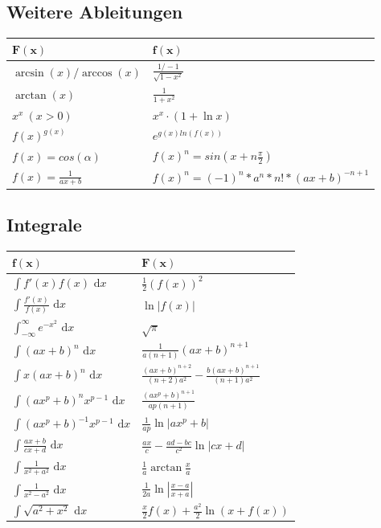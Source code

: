 \documentclass[8pt]{article}
\def\dx{\text{ d}x}
\begin{document}
\begin{multicols*}{3}
\subsection{Weitere Ableitungen}
\begin{center}
  \begin{tabularx}{\linewidth}{>{\centering\arraybackslash}X>{\centering\arraybackslash}X}
  
  $\mathbf{F(x)}$ & $\mathbf{f(x)}$ \\
  \midrule
  $\arcsin(x) / \arccos(x)$ & $\frac{1 / -1}{\sqrt{1 - x^2}}$ \\
  $\arctan(x)$ & $\frac{1}{1 + x^2}$ \\ 
  $x^x \ (x > 0)$ & $x^x \cdot (1 + \ln x)$ \\
$f(x)^{g(x)}$ & $e^{g(x) ln(f(x))}$\\
$f(x) = cos(\alpha)$ & $f(x)^n = sin(x + n\frac{\pi}{2})$\\
$f(x) = \frac{1}{ax + b}$ & $f(x)^n = (-1)^n * a^n * n! * (ax + b)^{-n+1}$\\

  \bottomrule
  \end{tabularx}
\end{center}
\subsection{Integrale}
\begin{center}
 \begin{tabularx}{\linewidth}{>{\centering\arraybackslash}X>{\centering\arraybackslash}X}
  
  $\mathbf{f(x)}$ & $\mathbf{F(x)}$ \\
  \midrule
  $\int f'(x) f(x) \dx$ & $\frac{1}{2}(f(x))^2$ \\
  $\int \frac{f'(x)}{f(x)} \dx$ & $\ln|f(x)|$ \\
  $\int_{-\infty}^\infty e^{-x^2} \dx$ & $\sqrt{\pi}$ \\
  $\int (ax+b)^n \dx$ & $\frac{1}{a(n+1)}(ax+b)^{n+1}$ \\
  $\int x(ax+b)^n \dx$ & $\frac{(ax+b)^{n+2}}{(n+2)a^2} - \frac{b(ax+b)^{n+1}}{(n+1)a^2}$ \\
  $\int (ax^p+b)^n x^{p-1} \dx$ & $\frac{(ax^p+b)^{n+1}}{ap(n+1)}$ \\
  $\int (ax^p + b)^{-1} x^{p-1} \dx$ & $\frac{1}{ap} \ln |ax^p + b|$ \\
  $\int \frac{ax+b}{cx+d} \dx$ & $\frac{ax}{c} - \frac{ad-bc}{c^2} \ln |cx +d|$ \\
  $\int \frac{1}{x^2+a^2} \dx$ & $\frac{1}{a} \arctan \frac{x}{a}$ \\
  $\int \frac{1}{x^2 - a^2} \dx$ & $\frac{1}{2a} \ln\left| \frac{x-a}{x+a} \right|$ \\
  $\int \sqrt{a^2+x^2} \dx $ & $\frac{x}{2}f(x) + \frac{a^2}{2}\ln(x+f(x))$ \\
  \bottomrule
 \end{tabularx}
\end{center}



\end{multicols*}
\end{document}
